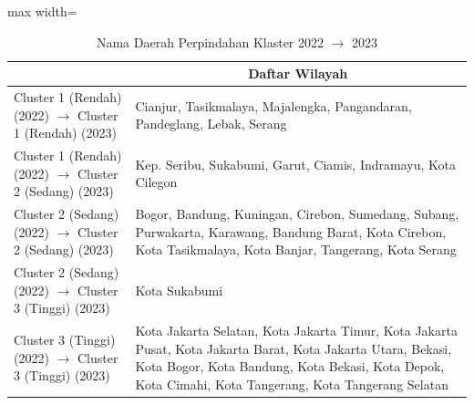\begin{table}[H]
\centering
\caption{Nama Daerah Perpindahan Klaster 2022 \(\rightarrow\) 2023} \label{tab:app2transname2022x2023}
\begin{adjustbox}{max width=\textwidth}
\begin{tabular}{|>{\centering\arraybackslash}p{4cm}|p{10cm}|}
\hline
\multicolumn{1}{|c|}{\textbf{Kategori}} & \multicolumn{1}{c|}{\textbf{Daftar Wilayah}} \\
\hline
Cluster 1 (Rendah) (2022) \(\rightarrow\) Cluster 1 (Rendah) (2023) & Cianjur, Tasikmalaya, Majalengka, Pangandaran, Pandeglang, Lebak, Serang \\
\hline
Cluster 1 (Rendah) (2022) \(\rightarrow\) Cluster 2 (Sedang) (2023) & Kep. Seribu, Sukabumi, Garut, Ciamis, Indramayu, Kota Cilegon \\
\hline
Cluster 2 (Sedang) (2022) \(\rightarrow\) Cluster 2 (Sedang) (2023) & Bogor, Bandung, Kuningan, Cirebon, Sumedang, Subang, Purwakarta, Karawang, Bandung Barat, Kota Cirebon, Kota Tasikmalaya, Kota Banjar, Tangerang, Kota Serang \\
\hline
Cluster 2 (Sedang) (2022) \(\rightarrow\) Cluster 3 (Tinggi) (2023) & Kota Sukabumi \\
\hline
Cluster 3 (Tinggi) (2022) \(\rightarrow\) Cluster 3 (Tinggi) (2023) & Kota Jakarta Selatan, Kota Jakarta Timur, Kota Jakarta Pusat, Kota Jakarta Barat, Kota Jakarta Utara, Bekasi, Kota Bogor, Kota Bandung, Kota Bekasi, Kota Depok, Kota Cimahi, Kota Tangerang, Kota Tangerang Selatan \\
\hline
\end{tabular}
\end{adjustbox}
\end{table}